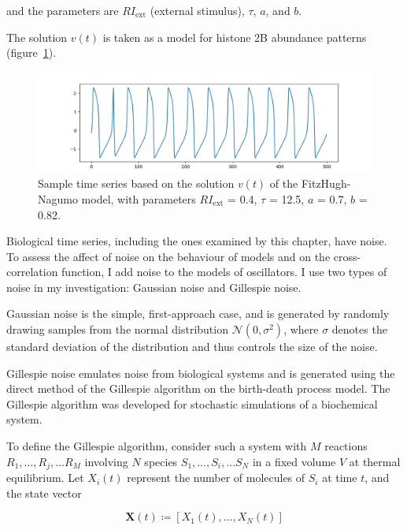 and the parameters are $RI_{\mathrm{ext}}$ (external stimulus), $\tau$, $a$, and $b$.

The solution $v(t)$ is taken as a model for histone 2B abundance patterns (figure~\ref{fig:fitzhughnagumo_sample}).

\begin{figure}
  \centering
  \includegraphics[width=0.9\linewidth]{fitzhughnagumo_sample.png}
  \caption{
    Sample time series based on the solution $v(t)$ of the FitzHugh-Nagumo model, with parameters
    $RI_{\mathrm{ext}}$ = 0.4, $\tau$ = 12.5, $a$ = 0.7, $b$ = 0.82.
  }
  \label{fig:fitzhughnagumo_sample}
\end{figure}

Biological time series, including the ones examined by this chapter, have noise.
To assess the affect of noise on the behaviour of models and on the cross-correlation function, I add noise to the models of oscillators.
I use two types of noise in my investigation: Gaussian noise and Gillespie noise.

Gaussian noise is the simple, first-approach case, and is generated by randomly drawing samples from the normal distribution $\mathcal{N}(0,\sigma^{2})$, where $\sigma$ denotes the standard deviation of the distribution and thus controls the size of the noise.

Gillespie noise emulates noise from biological systems and is generated using the direct method of the Gillespie algorithm \parencite{gillespieExactStochasticSimulation1977} on the birth-death process model.
The Gillespie algorithm was developed for stochastic simulations of a biochemical system.

To define the Gillespie algorithm, consider such a system with $M$ reactions $R_{1}, \ldots , R_{j}, \ldots R_{M}$ involving $N$ species $S_{1}, \ldots , S_{i}, \ldots S_{N}$ in a fixed volume $V$ at thermal equilibrium.
Let $X_{i}(t)$ represent the number of molecules of $S_{i}$ at time $t$, and the state vector

\begin{equation}
  \mathbf{X}(t) \coloneqq [X_{1}(t), \ldots , X_{N}(t)]
  \label{eq:gillespie-statevector}
\end{equation}

